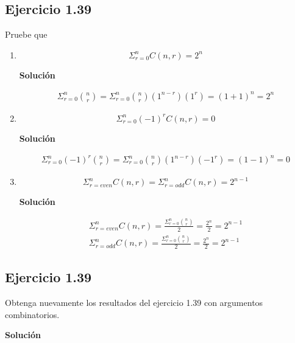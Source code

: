 \documentclass[12pt]{article}
\begin{document}
\subsection*{Ejercicio 1.39}
Pruebe que 
\begin{enumerate}
	\item 
    \begin{equation*}
		\Sigma_{r=0}^nC(n,r)=2^n
    \end{equation*}

\textbf{Solución}

\begin{eqnarray*}
	\Sigma_{r=0}^{n} \binom{n}{r}=\Sigma_{r=0}^{n} \binom{n}{r}(1^{n-r})(1^r)=(1+1)^n=2^n
\end{eqnarray*}
	
    \item 
    \begin{equation*}
		\Sigma_{r=0}^n(-1)^rC(n,r)=0
	\end{equation*}

\textbf{Solución}

\begin{eqnarray*}
	\Sigma_{r=0}^{n} (-1)^r \binom{n}{r}=\Sigma_{r=0}^{n} \binom{n}{r}(1^{n-r})(-1^r)=(1-1)^n=0
\end{eqnarray*}

\item
\begin{equation*}
	\Sigma_{r=even}^nC(n,r)=\Sigma_{r=odd}^nC(n,r)=2^{n-1}
\end{equation*}

\textbf{Solución}

\begin{eqnarray*}
	\Sigma_{r=even}^nC(n,r)=\frac{\Sigma_{r=0}^{n} \binom{n}{r}}{2}=\frac{2^n}{2}=2^{n-1}\\
	\Sigma_{r=odd}^nC(n,r)=\frac{\Sigma_{r=0}^{n} \binom{n}{r}}{2}=\frac{2^n}{2}=2^{n-1}
\end{eqnarray*}
	
\end{enumerate}

\subsection*{Ejercicio 1.39}
Obtenga nuevamente los resultados del ejercicio 1.39 con argumentos combinatorios.

\textbf{Solución}
\end{document}
